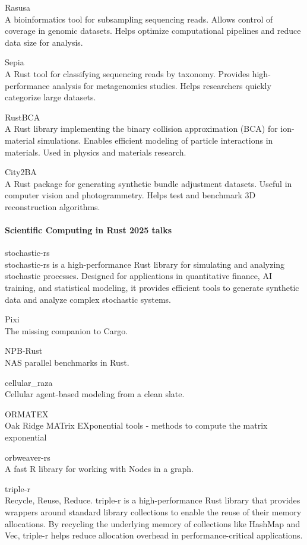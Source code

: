 \documentclass{article}
\begin{document}
Rasusa\\
A bioinformatics tool for subsampling sequencing reads. Allows control of coverage in
genomic datasets. Helps optimize computational pipelines and reduce data size for analysis.

Sepia\\
A Rust tool for classifying sequencing reads by taxonomy. Provides high-performance
analysis for metagenomics studies. Helps researchers quickly categorize large datasets.

RustBCA\\
A Rust library implementing the binary collision approximation (BCA) for ion-material
simulations. Enables efficient modeling of particle interactions in materials. Used in physics and
materials research.

City2BA\\
A Rust package for generating synthetic bundle adjustment datasets. Useful in computer
vision and photogrammetry. Helps test and benchmark 3D reconstruction algorithms.

\paragraph{Scientific Computing in Rust 2025 talks}

stochastic-rs\\
stochastic-rs is a high-performance Rust library for simulating and analyzing
stochastic processes. Designed for applications in quantitative finance, AI training, and
statistical modeling, it provides efficient tools to generate synthetic data and analyze complex
stochastic systems.

Pixi\\
The missing companion to Cargo.

NPB-Rust\\
NAS parallel benchmarks in Rust. \cite{martins2025npbrustnasparallelbenchmarks}

cellular\_raza\\
Cellular agent-based modeling from a clean slate.

ORMATEX\\
Oak Ridge MATrix EXponential tools - methods to compute the matrix exponential

orbweaver-rs\\
A fast R library for working with Nodes in a graph.

triple-r\\
Recycle, Reuse, Reduce. triple-r is a high-performance Rust library that provides
wrappers around standard library collections to enable the reuse of their memory allocations. By
recycling the underlying memory of collections like HashMap and Vec, triple-r helps reduce
allocation overhead in performance-critical applications.
\end{document}
